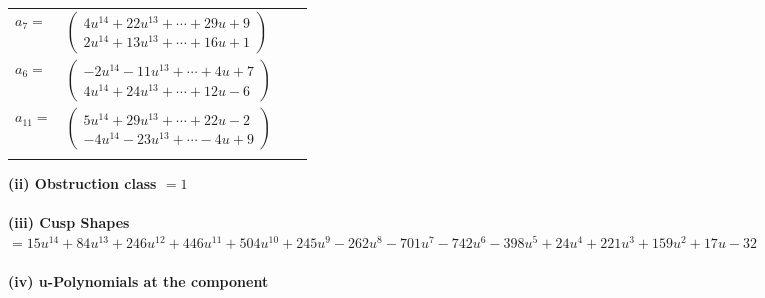 \documentclass[1p]{elsarticle_modified}
\theoremstyle{definition}
\begin{document}
\begin{tabular}{m{7pt} m{180pt} m{7pt} m{180pt} }
\flushright $a_{7}=$&$\begin{pmatrix}4 u^{14}+22 u^{13}+\cdots+29 u+9\\2 u^{14}+13 u^{13}+\cdots+16 u+1\end{pmatrix}$ \\
\flushright $a_{6}=$&$\begin{pmatrix}-2 u^{14}-11 u^{13}+\cdots+4 u+7\\4 u^{14}+24 u^{13}+\cdots+12 u-6\end{pmatrix}$ \\
\flushright $a_{11}=$&$\begin{pmatrix}5 u^{14}+29 u^{13}+\cdots+22 u-2\\-4 u^{14}-23 u^{13}+\cdots-4 u+9\end{pmatrix}$\\&\end{tabular}
\flushleft \textbf{(ii) Obstruction class $= 1$}\\~\\
\flushleft \textbf{(iii) Cusp Shapes $= 15 u^{14}+84 u^{13}+246 u^{12}+446 u^{11}+504 u^{10}+245 u^9-262 u^8-701 u^7-742 u^6-398 u^5+24 u^4+221 u^3+159 u^2+17 u-32$}\\~\\
\newpage\renewcommand{\arraystretch}{1}
\flushleft \textbf{(iv) u-Polynomials at the component}\newline \\
\end{document}
